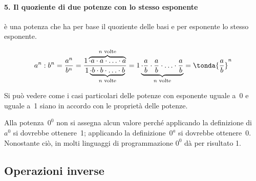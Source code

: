 \vspace{-1.5em}
\paragraph{5. Il quoziente di due potenze con lo stesso esponente} 
è una potenza che ha per base il quoziente delle basi e per esponente lo 
stesso esponente.

\[a^n : b^n = \frac{a^n}{b^n} = 
  \frac{1 \overbrace{\cdot a\cdot a\cdot\ldots\cdot a}^{n\text{ volte}}}
       {1 \underbrace{\cdot b\cdot b\cdot\ldots\cdot b}_{n\text{ volte}}}=
  1 \underbrace{\cdot \frac{a}{b}\cdot \frac{a}{b}\cdot\ldots\cdot
              \frac{a}{b}}_{n\text{ volte}}=
   \tonda{\frac{a}{b}}^n\]

\bigskip %

Si può vedere come i casi particolari delle potenze con esponente uguale 
a~0 e uguale a~1 siano in accordo con le proprietà delle potenze.

\vspace{-1.5em}

\begin{osservazione}{}{} 
Alla potenza~\(0^0\) non si assegna alcun valore perché applicando la 
definizione di~\(a^0\) si dovrebbe ottenere~1;
applicando la definizione~\(0^a\) si dovrebbe ottenere~0. Nonostante ciò, 
in molti linguaggi di programmazione \(0^0\) dà per risultato 1.
\end{osservazione}


\subsection{Operazioni inverse}

